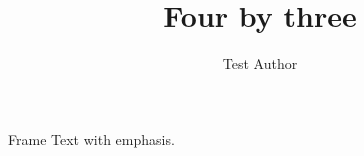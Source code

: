 \documentclass[aspectratio=43,11pt]{beamer}
\title{Four by three}
\author{Test Author}
\begin{document}
\maketitle
\begin{frame}{Frame}
	Text with \alert{emphasis}.
\end{frame}
\end{document}
